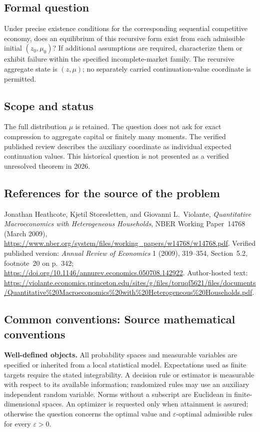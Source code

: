 \documentclass[11pt,a4paper]{article}
\begin{document}
\subsection*{Formal question}
Under precise existence conditions for the corresponding sequential competitive economy, does an equilibrium of this recursive form exist from each admissible initial $(z_0,\mu_0)$? If additional assumptions are required, characterize them or exhibit failure within the specified incomplete-market family. The recursive aggregate state is $(z,\mu)$; no separately carried continuation-value coordinate is permitted.
\subsection*{Scope and status}
The full distribution $\mu$ is retained. The question does not ask for exact compression to aggregate capital or finitely many moments. The verified published review describes the auxiliary coordinate as individual expected continuation values. This historical question is not presented as a verified unresolved theorem in 2026.
\subsection*{References for the source of the problem}
Jonathan Heathcote, Kjetil Storesletten, and Giovanni L.~Violante, \emph{Quantitative Macroeconomics with Heterogeneous Households}, NBER Working Paper~14768 (March 2009), \url{https://www.nber.org/system/files/working_papers/w14768/w14768.pdf}. Verified published version: \emph{Annual Review of Economics} 1 (2009), 319--354, Section~5.2, footnote~20 on p.~342; \url{https://doi.org/10.1146/annurev.economics.050708.142922}. Author-hosted text: \url{https://violante.economics.princeton.edu/sites/g/files/toruqf5621/files/documents/Quantitative%20Macroeconomics%20with%20Heterogeneous%20Households.pdf}.

\subsection*{Common conventions: Source mathematical conventions}

\textbf{Well-defined objects.}
All probability spaces and measurable variables are specified or inherited
from a local statistical model. Expectations used as finite targets require
the stated integrability. A decision rule or estimator is measurable with
respect to its available information; randomized rules may use an auxiliary
independent random variable. Norms without a subscript are Euclidean in
finite-dimensional spaces. An optimizer is requested only when attainment
is assured; otherwise the question concerns the optimal value and
$\varepsilon$-optimal admissible rules for every $\varepsilon>0$.
\end{document}
